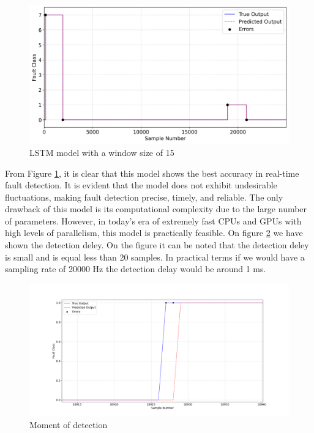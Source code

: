 \documentclass[11pt]{IEEEtran}
\begin{document}
\begin{figure}[H]
    \centering
    \includegraphics[width=1\linewidth]{figs/true_vs_predicted_model_window_size_15.png}
    \caption{LSTM model with a window size of 15}
    \label{fig:11}
\end{figure}
From Figure \ref{fig:11}, it is clear that this model shows the best accuracy in real-time fault detection. It is evident that the model does not exhibit undesirable fluctuations, making fault detection precise, timely, and reliable. The only drawback of this model is its computational complexity due to the large number of parameters. However, in today's era of extremely fast CPUs and GPUs with high levels of parallelism, this model is practically feasible. On figure \ref{fig:transition} we have shown the detection deley. On the figure it can be noted that the detection deley is small and is equal less than 20 samples. In practical terms if we would have a sampling rate of 20000 Hz the detection delay would be around 1 ms.
\begin{figure}[H]
    \centering
    \includegraphics[width=\linewidth]{figs/transition.png}
    \caption{Moment of detection}
    \label{fig:transition}
\end{figure}
\end{document}
